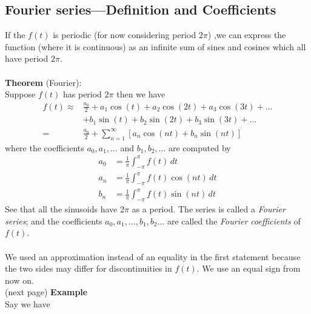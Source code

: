 \documentclass{report}
\begin{document}
\subsection{Fourier series---Definition and Coefficients}
If the $f(t)$ is periodic (for now considering period $2\pi$)
,we can express the function (where it is continuous) as an
infinite sum of sines and cosines which all have period $2\pi$.\\
\vspace{1mm}\\
\textbf{Theorem} (Fourier):\\
Suppose $f(t)$ has period $2\pi$ then we have
\begin{align*}
f(t)\approx&\frac{a_0}{2}+a_1\cos(t)+a_2\cos(2t)+a_3\cos(3t)+\ldots\\
&+b_1\sin(t)+b_2\sin(2t)+b_3\sin(3t)+\ldots\\
=&\frac{a_0}{2}+\sum^{\infty}_{n=1}[a_n\cos(nt)+b_n\sin(nt)]
\end{align*}
where the coefficients $a_0,a_1,\ldots$ and $b_1,b_2,\ldots$ are computed by
\begin{align*}
a_0&=\frac{1}{\pi}\int^\pi_{-\pi}f(t)\,dt\\
a_n&=\frac{1}{\pi}\int^\pi_{-\pi}f(t)\cos(nt)\,dt\\
b_n&=\frac{1}{\pi}\int^\pi_{-\pi}f(t)\sin(nt)\,dt
\end{align*}
See that all the sinusoids have $2\pi$ as a period. The series is called a \textit{Fourier series}; and the
coefficients $a_0,a_1,\ldots,b_1,b_2\ldots$ are called the \textit{Fourier coefficients} of $f(t)$.\\
\vspace{1mm}\\
We used an approximation instead of an equality in the first statement because the two sides may differ 
for discontinuities in $f(t)$. We use an equal sign from now on.\\
(next page)
\newpage
\noindent\textbf{Example}\\
Say we have



\newpage
\end{document}
